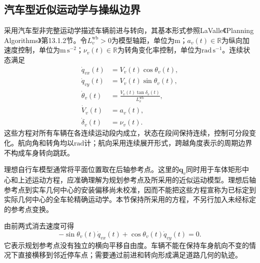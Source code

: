 \subsection{汽车型近似运动学与操纵边界}

采用汽车型非完整运动学描述车辆前进与转向，其基本形式参照LaValle《Planning Algorithms》第13.1.2节\cite{LaValle2006}。令$L_v^{\mathrm{wb}}>0$为模型轴距，单位为$\mathrm m$；$a_v(t)\in\mathbb R$为纵向加速度控制，单位为$\mathrm{m\,s^{-2}}$；$\nu_v(t)\in\mathbb R$为转角变化率控制，单位为$\mathrm{rad\,s^{-1}}$。连续状态满足
\begin{subequations}
\label{s0407:vehicle_kinematics}
\begin{align}
 \dot q_{vx}(t)&=V_v(t)\cos\theta_v(t),
 \label{s0407:vehicle_x_rate}\\
 \dot q_{vy}(t)&=V_v(t)\sin\theta_v(t),
 \label{s0407:vehicle_y_rate}\\
 \dot\theta_v(t)&=
      \frac{V_v(t)\tan\delta_v(t)}{L_v^{\mathrm{wb}}},
 \label{s0407:vehicle_heading_rate}\\
 \dot V_v(t)&=a_v(t),
 \label{s0407:vehicle_speed_rate}\\
 \dot\delta_v(t)&=\nu_v(t).
 \label{s0407:vehicle_steering_rate}
\end{align}
\end{subequations}
这些方程对所有车辆在各连续运动段内成立，状态在段间保持连续，控制可分段变化。航向角和转角均以$\mathrm{rad}$计；航向采用连续展开形式，跨越角度表示的周期边界不构成车身转向跳跃。

理想自行车模型通常将平面位置取在后轴参考点。这里的$\mathbf q_v$同时用于车体矩形中心和上述运动方程，应准确理解为规划参考点及所采用的近似运动模型。理想后轴参考点到实车几何中心的安装偏移尚未校准，因而不能把这些方程宣称为已标定到实际几何中心的全车轮精确运动学。本节保持所采用的方程，不另行加入未经标定的参考点变换。

由前两式消去速度可得
\begin{equation}
 -\sin\theta_v(t)\dot q_{vx}(t)
 +\cos\theta_v(t)\dot q_{vy}(t)=0.
 \label{s0407:no_lateral_translation}
\end{equation}
它表示规划参考点没有独立的横向平移自由度。车辆不能在保持车身航向不变的情况下直接横移到邻近停车点；需要通过前进和转向形成满足道路几何的轨迹。

